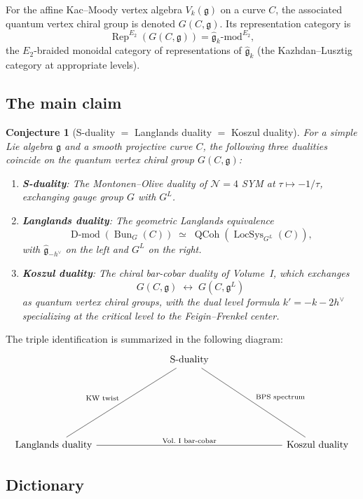 \documentclass[11pt]{article}
\newtheorem{conjecture}[theorem]{Conjecture}
\theoremstyle{definition}
\theoremstyle{remark}
\DeclareMathOperator{\Bun}{Bun}
\DeclareMathOperator{\LocSys}{LocSys}
\DeclareMathOperator{\QCoh}{QCoh}
\DeclareMathOperator{\Dmod}{D\text{-}mod}
\DeclareMathOperator{\Rep}{Rep}
\newcommand{\g}{\mathfrak{g}}
\newcommand{\gL}{\mathfrak{g}^L}
\newcommand{\hv}{h^\vee}
\begin{document}
For the affine Kac--Moody vertex algebra $V_k(\g)$ on a curve $C$, the
associated quantum vertex chiral group is denoted $G(C,\g)$. Its
representation category is
\[
 \Rep^{E_2}(G(C,\g)) = \hat{\g}_k\text{-mod}^{E_2},
\]
the $E_2$-braided monoidal category of representations of $\hat{\g}_k$ (the
Kazhdan--Lusztig category at appropriate levels).

\subsection{The main claim}

\begin{conjecture}[S-duality $=$ Langlands duality $=$ Koszul duality]
\label{conj:triple}
For a simple Lie algebra $\g$ and a smooth projective curve $C$, the following
three dualities coincide on the quantum vertex chiral group $G(C,\g)$:
\begin{enumerate}[label=(\roman*)]
 \item \textbf{S-duality}: The Montonen--Olive duality of $\mathcal{N}=4$ SYM
 at $\tau \mapsto -1/\tau$, exchanging gauge group $G$ with $G^L$.
 \item \textbf{Langlands duality}: The geometric Langlands equivalence
 \[
 \Dmod(\Bun_G(C)) \;\simeq\;
 \QCoh(\LocSys_{G^L}(C)),
 \]
 with $\hat{\g}_{-\hv}$ on the left and $G^L$ on the right.
 \item \textbf{Koszul duality}: The chiral bar-cobar duality of Volume~I,
 which exchanges
 \[
 G(C,\g) \;\longleftrightarrow\; G(C,\gL)
 \]
 as quantum vertex chiral groups, with the dual level formula
 $k' = -k - 2\hv$ specializing at the critical level to the
 Feigin--Frenkel center.
\end{enumerate}
\end{conjecture}

The triple identification is summarized in the following diagram:
\[
\begin{tikzcd}[row sep=2.5cm, column sep=2.5cm]
 & \text{S-duality} \arrow[dl, dash, "\text{KW twist}"']
 \arrow[dr, dash, "\text{BPS spectrum}"] & \\
 \text{Langlands duality}
 \arrow[rr, dash, "\text{Vol.~I bar-cobar}"]
 & & \text{Koszul duality}
\end{tikzcd}
\]

\subsection{Dictionary}
\end{document}
